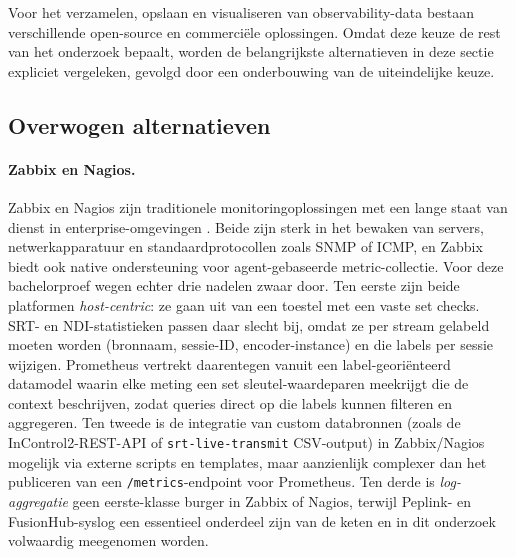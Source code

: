Voor het verzamelen, opslaan en visualiseren van observability-data bestaan verschillende open-source en commerciële oplossingen. Omdat deze keuze de rest van het onderzoek bepaalt, worden de belangrijkste alternatieven in deze sectie expliciet vergeleken, gevolgd door een onderbouwing van de uiteindelijke keuze.

\subsection{Overwogen alternatieven}
\label{sec:tool-alternatieven}

\paragraph{Zabbix en Nagios.} Zabbix en Nagios zijn traditionele monitoringoplossingen met een lange staat van dienst in enterprise-omgevingen \autocite{Turnbull2016}. Beide zijn sterk in het bewaken van servers, netwerkapparatuur en standaardprotocollen zoals SNMP of ICMP, en Zabbix biedt ook native ondersteuning voor agent-gebaseerde metric-collectie. Voor deze bachelorproef wegen echter drie nadelen zwaar door. Ten eerste zijn beide platformen \emph{host-centric}: ze gaan uit van een toestel met een vaste set checks. SRT- en NDI-statistieken passen daar slecht bij, omdat ze per stream gelabeld moeten worden (bronnaam, sessie-ID, encoder-instance) en die labels per sessie wijzigen. Prometheus vertrekt daarentegen vanuit een label-georiënteerd datamodel waarin elke meting een set sleutel-waardeparen meekrijgt die de context beschrijven, zodat queries direct op die labels kunnen filteren en aggregeren. Ten tweede is de integratie van custom databronnen (zoals de InControl2-REST-API of \texttt{srt-live-transmit} CSV-output) in Zabbix/Nagios mogelijk via externe scripts en templates, maar aanzienlijk complexer dan het publiceren van een \texttt{/metrics}-endpoint voor Prometheus. Ten derde is \emph{log-aggregatie} geen eerste-klasse burger in Zabbix of Nagios, terwijl Peplink- en FusionHub-syslog een essentieel onderdeel zijn van de keten en in dit onderzoek volwaardig meegenomen worden.

